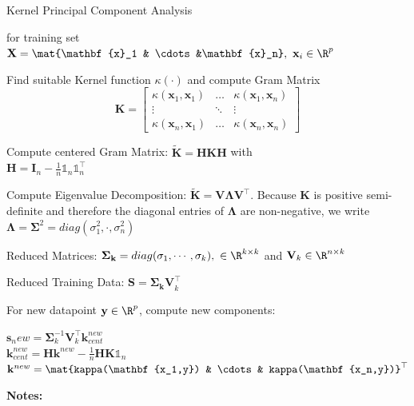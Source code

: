 \documentclass[english]{latex4ei/latex4ei_sheet}
\begin{document}
\begin{sectionbox}
\begin{cookbox}{Kernel Principal Component Analysis}
    \item  for training set $\mathbf{X}=\mat{\mathbf{x}_1 & \cdots &\mathbf{x}_n}, \ \mathbf{x}_i\in\R^p$
	\item Find suitable Kernel function $\kappa(\cdot)$ and compute Gram Matrix
	\[
    \mathbf{K}=
    \begin{bmatrix}
    \kappa(\mathbf{x}_1,\mathbf{x}_1) & \dots  & \kappa(\mathbf{x}_1,\mathbf{x}_n) \\
    \vdots & \ddots & \vdots \\
    \kappa(\mathbf{x}_n,\mathbf{x}_1) & \dots  & \kappa(\mathbf{x}_n,\mathbf{x}_n)
    \end{bmatrix}
    \]
	\item Compute centered Gram Matrix: $\mathbf{\tilde{K}=HKH}$ with\\ $\mathbf{H=I}_n-\frac{1}{n}\mathds{1}_n\mathds{1}_n^{\top}$
	\item Compute Eigenvalue Decomposition: $\mathbf{\tilde{K}=V\Lambda V^{\top}}$. Because $\mathbf{K}$ is positive semi-definite and therefore the diagonal entries of $\mathbf{\Lambda}$ are non-negative, we write $\mathbf{\Lambda=\Sigma}^2=diag(\sigma_1^2, \cdot, \sigma_n^2)$
	\item Reduced Matrices: $\mathbf{\Sigma_k}=diag(\sigma_1,\cdots,\sigma_k),\ \in\R^{k\times k}$ and $\mathbf{V}_k\in\R^{n\times k}$
	\item Reduced Training Data: $\mathbf{S=\Sigma_kV}_k^{\top}$
	\item For new datapoint $\mathbf{y}\in\R^p$, compute new components: 
	\begin{center}
		$\mathbf{s}_new=\mathbf{\Sigma}_k^{-1}\mathbf{V}_k^{\top}\mathbf{k}_{cent}^{new}$\\
	    $\mathbf{k}_{cent}^{new}=\mathbf{Hk}_{}^{new}-\frac{1}{n}\mathbf{HK}\mathds{1}_n$\\
		$\mathbf{k}^{new}=\mat{kappa(\mathbf{x_1,y}) & \cdots & kappa(\mathbf{x_n,y})}^{\top}$
	\end{center}
\end{cookbox}
\end{sectionbox}
\textbf{Notes:}

\newpage
\end{document}
